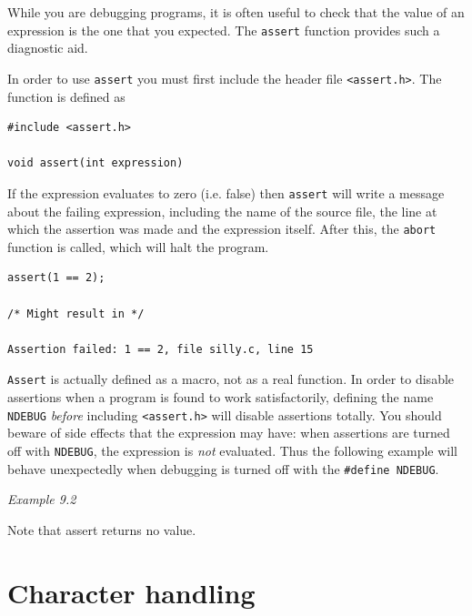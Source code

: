   

  While you are debugging programs, it is often useful to
   check that the value of an expression is the one that you
   expected. The \texttt{assert} function provides such a diagnostic
   aid.


  In order to use \texttt{assert} you must first include the header
   file \texttt{<assert.h>}.  The function is defined as


  \begin{Verbatim}
#include <assert.h>

void assert(int expression)
\end{Verbatim}

  If the expression  evaluates  to  zero  (i.e.   false)  then
   \texttt{assert}  will  write  a message about the failing expression,
   including the name of the source file, the line at which the
   assertion  was  made and the expression itself.  After this,
   the \texttt{abort} function is called, which will halt the program.


  \begin{Verbatim}
assert(1 == 2);

/* Might result in */

Assertion failed: 1 == 2, file silly.c, line 15
\end{Verbatim}

  \texttt{Assert} is actually  defined  as  a  macro,  not  as  a  real
   function.  In  order to disable assertions when a program is
   found to  work  satisfactorily,  defining  the  name  \texttt{NDEBUG}
   \textit{before} including \texttt{<assert.h>} will disable
   assertions totally.
   You should beware of side effects that  the  expression  may
   have:  when  assertions  are  turned  off  with  \texttt{NDEBUG}, the
   expression is \textit{not} evaluated. Thus the following example will
   behave  unexpectedly  when  debugging is turned off with the
   \texttt{\#define NDEBUG}.


  \begin{center}\textit{Example 9.2}\end{center}


  Note that assert returns no value.


 
        \section{Character handling}
        

